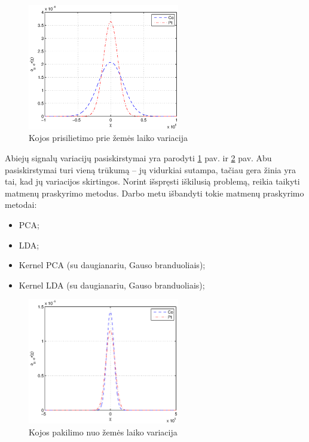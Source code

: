 \documentclass[]{vgtuef}
\begin{document}
\begin{figure}[!t]
  \centering
  \includegraphics[width=250px]{figures/stance_phase.eps}
  \caption{Kojos prisilietimo prie žemės laiko variacija}
  \label{fig:stance_var}
\end{figure}

Abiejų signalų variacijų pasiskirstymai yra parodyti \ref{fig:stance_var} pav. ir \ref{fig:swing_var} pav. Abu pasiskirstymai turi vieną trūkumą -- jų vidurkiai sutampa, tačiau gera žinia yra tai, kad jų variacijos skirtingos. Norint išspręsti iškilusią problemą, reikia taikyti matmenų praskyrimo metodus. Darbo metu išbandyti tokie matmenų praskyrimo metodai:

\begin{itemize}
\item PCA;
\item LDA;
\item Kernel PCA (su daugianariu, Gauso branduoliais);
\item Kernel LDA (su daugianariu, Gauso branduoliais);
\end{itemize}

\begin{figure}[!t]
  \centering
  \includegraphics[width=250px]{figures/swing_phase.eps}
  \caption{Kojos pakilimo nuo žemės laiko variacija}
  \label{fig:swing_var}
\end{figure}
\end{document}
